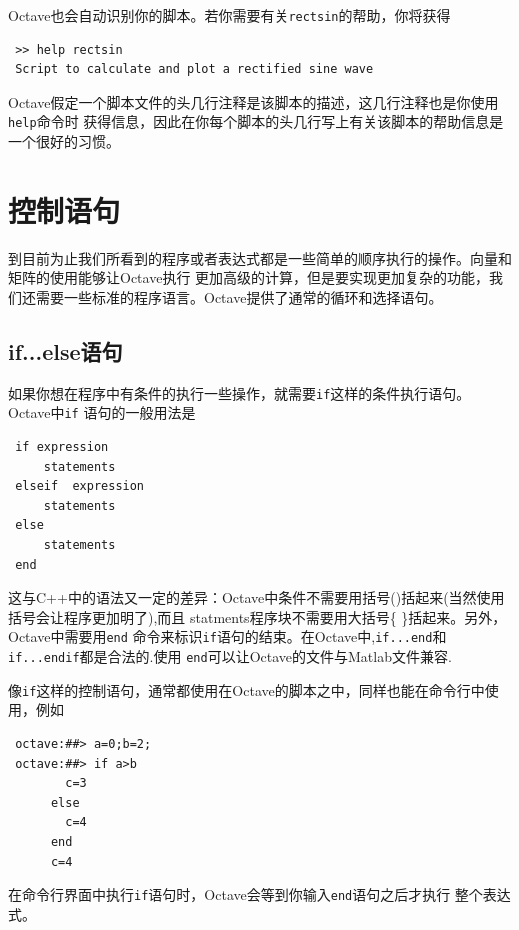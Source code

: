 \documentclass[UTF8,adobefonts]{ctexart}
\begin{document}
Octave也会自动识别你的脚本。若你需要有关{\tt rectsin}的帮助，你将获得
\begin{verbatim}
 >> help rectsin
 Script to calculate and plot a rectified sine wave
\end{verbatim}
 Octave假定一个脚本文件的头几行注释是该脚本的描述，这几行注释也是你使用{\tt help}命令时
获得信息，因此在你每个脚本的头几行写上有关该脚本的帮助信息是一个很好的习惯。
\section{控制语句}
到目前为止我们所看到的程序或者表达式都是一些简单的顺序执行的操作。向量和矩阵的使用能够让Octave执行
更加高级的计算，但是要实现更加复杂的功能，我们还需要一些标准的程序语言。Octave提供了通常的循环和选择语句。
\subsection{{\bf if...else}语句}
如果你想在程序中有条件的执行一些操作，就需要{\tt if}这样的条件执行语句。Octave中{\tt if}
语句的一般用法是
\begin{verbatim}
 if expression
     statements
 elseif  expression
     statements
 else 
     statements
 end
\end{verbatim}
这与C++中的语法又一定的差异：Octave中条件不需要用括号()括起来(当然使用括号会让程序更加明了),而且
statments程序块不需要用大括号\{ \}括起来。另外，Octave中需要用{\tt end}
命令来标识{\tt if}语句的结束。在Octave中,{\tt if...end}和{\tt if...endif}都是合法的.使用
{\tt end}可以让Octave的文件与Matlab文件兼容.

像{\tt if}这样的控制语句，通常都使用在Octave的脚本之中，同样也能在命令行中使用，例如
\begin{verbatim}
 octave:##> a=0;b=2;
 octave:##> if a>b
        c=3
      else
        c=4
      end
      c=4
\end{verbatim}
在命令行界面中执行{\tt if}语句时，Octave会等到你输入{\tt end}语句之后才执行
整个表达式。
\end{document}
